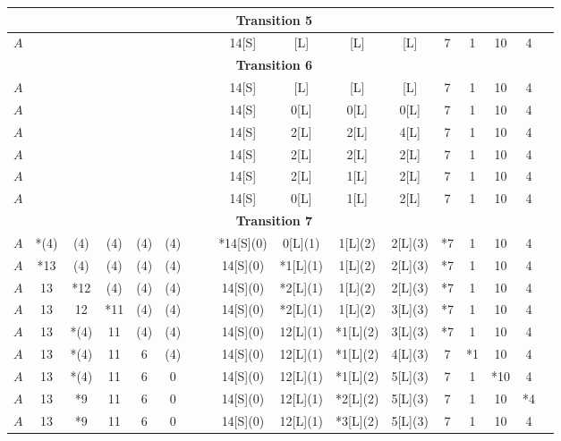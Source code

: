 \begin{center}
{\begin{tabular}{ | l | c | c | c | c | c | c | c | c | c | c | c | c | c | c | c | c | }
            \multicolumn{16}{c}{\textbf{Transition 5}}\\
            \hline
            $A$  & & & & & & & & 14[S] & [L] & [L] & [L] & 7 & 1 & 10 & 4 \\ \hline
            \multicolumn{16}{c}{\textbf{Transition 6}}\\
            \hline
            $A$  & & & & & & & & 14[S] & [L] & [L] & [L] & 7 & 1 & 10 & 4 \\ \hline
            $A$  & & & & & & & & 14[S] & 0[L] & 0[L] & 0[L] & 7 & 1 & 10 & 4 \\ \hline
            $A$  & & & & & & & & 14[S] & 2[L] & 2[L] & 4[L] & 7 & 1 & 10 & 4 \\ \hline
            $A$  & & & & & & & & 14[S] & 2[L] & 2[L] & 2[L] & 7 & 1 & 10 & 4 \\ \hline
            $A$  & & & & & & & & 14[S] & 2[L] & 1[L] & 2[L] & 7 & 1 & 10 & 4 \\ \hline
            $A$  & & & & & & & & 14[S] & 0[L] & 1[L] & 2[L] & 7 & 1 & 10 & 4 \\ \hline
            \multicolumn{16}{c}{\textbf{Transition 7}}\\
            \hline
            $A$  & *(4) & (4) & (4) & (4) & (4) & & & *14[S](0) & 0[L](1) & 1[L](2) & 2[L](3) & *7 & 1 & 10 & 4 \\ \hline
            $A$  & *13 & (4) & (4) & (4) & (4) & & & 14[S](0) & *1[L](1) & 1[L](2) & 2[L](3) & *7 & 1 & 10 & 4 \\ \hline
            $A$  & 13 & *12 & (4) & (4) & (4) & & & 14[S](0) & *2[L](1) & 1[L](2) & 2[L](3) & *7 & 1 & 10 & 4 \\ \hline
            $A$  & 13 & 12 & *11 & (4) & (4) & & & 14[S](0) & *2[L](1) & 1[L](2) & 3[L](3) & *7 & 1 & 10 & 4 \\ \hline
            $A$  & 13 & *(4) & 11 & (4) & (4) & & & 14[S](0) & 12[L](1) & *1[L](2) & 3[L](3) & *7 & 1 & 10 & 4 \\ \hline
            $A$  & 13 & *(4) & 11 & 6 & (4) & & & 14[S](0) & 12[L](1) & *1[L](2) & 4[L](3) & 7 & *1 & 10 & 4 \\ \hline
            $A$  & 13 & *(4) & 11 & 6 & 0 & & & 14[S](0) & 12[L](1) & *1[L](2) & 5[L](3) & 7 & 1 & *10 & 4 \\ \hline 
            $A$  & 13 & *9 & 11 & 6 & 0 & & & 14[S](0) & 12[L](1) & *2[L](2) & 5[L](3) & 7 & 1 & 10 & *4 \\ \hline
            $A$  & 13 & *9 & 11 & 6 & 0 & & & 14[S](0) & 12[L](1) & *3[L](2) & 5[L](3) & 7 & 1 & 10 & 4 \\ \hline

\end{tabular}}
\end{center}
